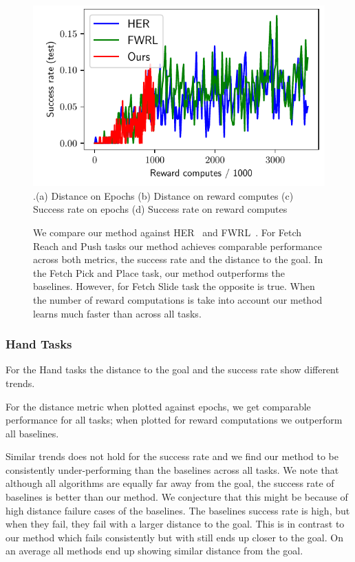 \begin{figure}
  \includegraphics[width=\frac\columnwidth]{media/res/6efc1de-path_reward_low_thresh_chosen-FetchSlidePR-v1-dqst/reward_computes-test/success_rate.pdf}\\
  {.\tiny\color{blue}\hspace{0.8cm}(a) Distance on Epochs \hspace{1.05cm}(b) Distance on
    reward computes
    \hspace{0.70cm} (c) Success rate on epochs \hspace{0.9cm} (d) Success rate on reward computes}
  \label{fig:path-reward-fetch}%
  \caption{ We compare our method against HER~\citep{andrychowicz2016learning}
    and FWRL~\citep{dhiman2018floydwarshall}.
For Fetch Reach and Push tasks our method achieves comparable performance
across both metrics, the success rate and the distance to the goal. In the Fetch
Pick and Place task, our method outperforms the baselines. However, for Fetch
Slide task the opposite is true.
When the number of reward computations is take into account our method learns
much faster than across all tasks.
  }%
\end{figure}

\subsubsection{Hand Tasks}

For the Hand tasks the distance to the goal and the success rate show different trends.

For the distance metric when plotted against epochs, we get comparable
performance for all tasks; when plotted for reward computations we outperform
all baselines.

Similar trends does not hold for the success rate and we find our method to be
consistently under-performing than the baselines across all tasks. We note that
although all algorithms are equally far away from the goal, the success rate of
baselines is better than our method. We conjecture that this might be because of
high distance failure cases of the baselines. The baselines success rate is
high, but when they fail, they fail with a larger distance to the goal. This is
in contrast to our method which fails consistently but with still ends up closer
to the goal. On an average all methods end up showing similar distance from the goal.

